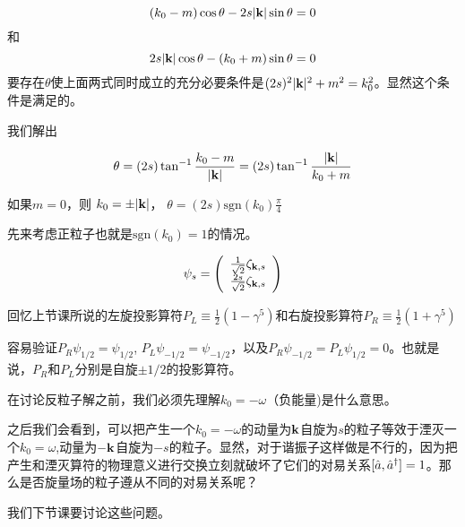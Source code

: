 \documentclass[CJK]{beamer}
\begin{document}
\begin{frame}
\bch
$$(k_0-m)\cos\theta - 2s |\veck| \sin\theta = 0$$
和
$$ 2s|\veck| \cos\theta - (k_0+m) \sin\theta = 0$$
要存在$\theta$使上面两式同时成立的充分必要条件是$(2s)^2 |\veck|^2 + m^2 = k_0^2$。显然这个条件是满足的。

\skipline
我们解出

$$\theta = (2s) \tan^{-1} \frac{k_0-m}{|\veck|} = (2s) \tan^{-1} \frac{|\veck|}{k_0+m}$$

\ech
\end{frame}


\begin{frame}
\bch
如果$m = 0$，则 $k_0 = \pm |\veck|$， $\theta = (2s)\mathrm{sgn}(k_0)\frac{\pi}{4}$

先来考虑正粒子也就是$\mathrm{sgn}(k_0) = 1$的情况。

\begin{equation}
\psi_s =  \bmat{c}
\frac{1}{\sqrt{2}} \zeta_{\veck,s} \\
\frac{2s}{\sqrt{2}} \zeta_{\veck,s} \nonumber
\emat
\end{equation}

回忆上节课所说的左旋投影算符$P_L \equiv \frac{1}{2}(1-\gamma^5)$和右旋投影算符$P_R\equiv \frac{1}{2}(1+\gamma^5)$

容易验证$P_R \psi_{1/2} = \psi_{1/2}$, $P_L\psi_{-1/2} = \psi_{-1/2}$，以及$P_R \psi_{-1/2} = P_L \psi_{1/2}= 0$。也就是说，$P_R$和$P_L$分别是自旋$\pm 1/2$的投影算符。

\ech
\end{frame}

\begin{frame}
\bch
在讨论反粒子解之前，我们必须先理解$k_0 = -\omega$（负能量)是什么意思。


\skipline
之后我们会看到，可以把产生一个$k_0 = -\omega$的动量为$\veck$自旋为$s$的粒子等效于湮灭一个$k_0 = \omega$,动量为$-\veck$自旋为$-s$的粒子。显然，对于谐振子这样做是不行的，因为把产生和湮灭算符的物理意义进行交换立刻就破坏了它们的对易关系$[\hata,\adag]=1$。那么是否旋量场的粒子遵从不同的对易关系呢？

\skipline

我们下节课要讨论这些问题。
\ech
\end{frame}
\end{document}

